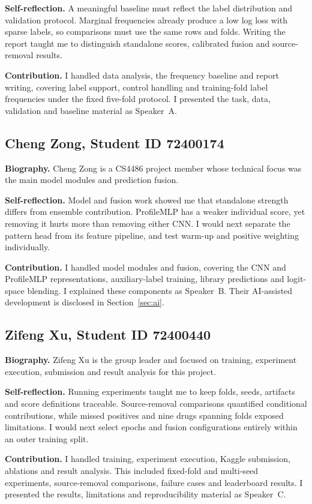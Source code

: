 \documentclass[journal]{IEEEtran}
\begin{document}
\textbf{Self-reflection.} A meaningful baseline must reflect the label distribution and validation protocol. Marginal frequencies already produce a low log loss with sparse labels, so comparisons must use the same rows and folds. Writing the report taught me to distinguish standalone scores, calibrated fusion and source-removal results.

\textbf{Contribution.} I handled data analysis, the frequency baseline and report writing, covering label support, control handling and training-fold label frequencies under the fixed five-fold protocol. I presented the task, data, validation and baseline material as Speaker~A.

\subsection{Cheng Zong, Student ID 72400174}
\textbf{Biography.} Cheng Zong is a CS4486 project member whose technical focus was the main model modules and prediction fusion.

\textbf{Self-reflection.} Model and fusion work showed me that standalone strength differs from ensemble contribution. ProfileMLP has a weaker individual score, yet removing it hurts more than removing either CNN. I would next separate the pattern head from its feature pipeline, and test warm-up and positive weighting individually.

\textbf{Contribution.} I handled model modules and fusion, covering the CNN and ProfileMLP representations, auxiliary-label training, library predictions and logit-space blending. I explained these components as Speaker~B. Their AI-assisted development is disclosed in Section~\ref{sec:ai}.

\subsection{Zifeng Xu, Student ID 72400440}
\textbf{Biography.} Zifeng Xu is the group leader and focused on training, experiment execution, submission and result analysis for this project.

\textbf{Self-reflection.} Running experiments taught me to keep folds, seeds, artifacts and score definitions traceable. Source-removal comparisons quantified conditional contributions, while missed positives and nine drugs spanning folds exposed limitations. I would next select epochs and fusion configurations entirely within an outer training split.

\textbf{Contribution.} I handled training, experiment execution, Kaggle submission, ablations and result analysis. This included fixed-fold and multi-seed experiments, source-removal comparisons, failure cases and leaderboard results. I presented the results, limitations and reproducibility material as Speaker~C.
\end{document}
